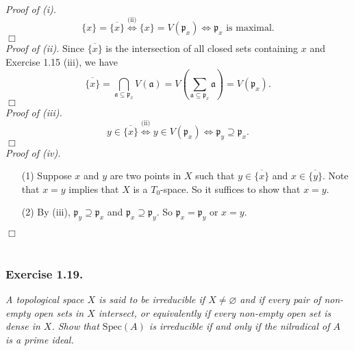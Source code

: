 \documentclass{article}
\begin{document}
\emph{Proof of (i).}
  \[
    \{x\} = \overline{\{x\}}
    \stackrel{\text{(ii)}}{\Longleftrightarrow}
    \{x\} = V(\mathfrak{p}_x)
    \Longleftrightarrow
    \text{$\mathfrak{p}_x$ is maximal}.
  \]
$\Box$ \\



\emph{Proof of (ii).}
  Since $\overline{\{x\}}$ is the intersection of all closed sets containing $x$ and Exercise 1.15 (iii),
  we have
  \[
    \overline{\{x\}}
    = \bigcap_{\mathfrak{a} \subseteq \mathfrak{p}_x} V(\mathfrak{a})
    = V\left( \sum_{\mathfrak{a} \subseteq \mathfrak{p}_x} \mathfrak{a} \right) 
    = V(\mathfrak{p}_x).
  \]
$\Box$ \\



\emph{Proof of (iii).}
  \[
    y \in \overline{\{x\}}
    \stackrel{\text{(ii)}}{\Longleftrightarrow}
    y \in V(\mathfrak{p}_x)
    \Longleftrightarrow
    \mathfrak{p}_y \supseteq \mathfrak{p}_x.
  \]
$\Box$ \\



\emph{Proof of (iv).}
\begin{enumerate}
\item[(1)]
  Suppose $x$ and $y$ are two points in $X$ such that $y \in \overline{\{x\}}$ and $x \in \overline{\{y\}}$.
  Note that $x = y$ implies that $X$ is a $T_0$-space.
  So it suffices to show that $x = y$.

\item[(2)]
  By (iii), $\mathfrak{p}_y \supseteq \mathfrak{p}_x$ and $\mathfrak{p}_x \supseteq \mathfrak{p}_y$.
  So $\mathfrak{p}_x = \mathfrak{p}_y$ or $x = y$.
\end{enumerate}
$\Box$ \\\\






\subsubsection*{Exercise 1.19.}
\emph{A topological space $X$ is said to be irreducible if
$X \neq \varnothing$ and if every pair of non-empty open sets in $X$ intersect, or
equivalently if every non-empty open set is dense in $X$.
Show that $\mathrm{Spec}(A)$ is irreducible if and only if
the nilradical of $A$ is a prime ideal.} \\
\end{document}
